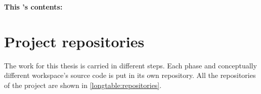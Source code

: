 \begin{figure}[H]%
		\label{fig:\chaptername\thechapter}%
\end{figure}

\vspace*{-1.45cm}
\noindent \large{\textbf{This {\MakeLowercase{\chaptername}}'s contents:}}
\vspace*{-0.65cm}
\minitoc \mtcskip \minilof
\vspace*{-1.2cm}
\section{Project repositories} \label{section:SourceCode/Projectrepositories}
The work for this thesis is carried in different steps. Each phase and conceptually different workspace's source code is put in its own repository. All the repositories of the project are shown in \hyperref[longtable:repositories]{\autoref{longtable:repositories}}.

